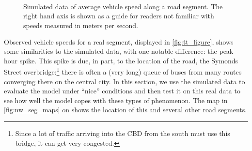 \begin{knitrout}\small
{}\color{fgcolor}\begin{figure}

{\centering {}\\
\\
\\

}

\caption[Simulated data of average vehicle speed along a road segment]{Simulated data of average vehicle speed along a road segment. The right hand axis is shown as a guide for readers not familiar with speeds measured in meters per second.}\label{fig:nw_sim_data}
\end{figure}


\end{knitrout}


Observed vehicle speeds for a real segment, displayed in \cref{fig:tt_figure}, shows some similarities to the simulated data, with one notable difference: the peak-hour spike. This spike is due, in part, to the location of the road, the Symonds Street overbridge:\footnote{Since a lot of traffic arriving into the CBD from the south must use this bridge, it can get very congested.} there is often a (very long) queue of buses from many routes converging there on the central city. In this section, we use the simulated data to evaluate the model under ``nice'' conditions and then test it on this real data to see how well the model copes with these types of phenomenon. The map in \cref{fig:nw_seg_maps} on  shows the location of this and several other road segments.


